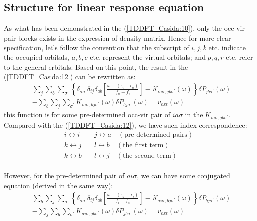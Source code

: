\subsection{Structure for linear response equation}
\label{TDDFT:1}
%
%
%
%
%
As what has been demonstrated in the (\ref{TDDFT_Casida:10}), only
the occ-vir pair blocks exists in the expression of density matrix.
Hence for more clear specification, let's follow the convention
that the subscript of $i,j, k$ etc. indicate the occupied orbitals,
$a, b, c$ etc. represent the virtual orbitals; and $p, q, r$ etc.
refer to the general orbitals.
Based on this point, the result in the (\ref{TDDFT_Casida:12}) can be
rewritten as:
\begin{equation}
\label{TDDFT_Casida:18} 
 \begin{split}
  &\sum_{j}\sum_{b}\sum_{\sigma^{'}}\left\lbrace 
\delta_{\sigma\sigma^{'}}\delta_{ij}\delta_{ab}\left[ 
\frac{\omega - (\epsilon_{i} - \epsilon_{a})}{f_{a} -
f_{i}} \right] 
- K_{ia\sigma,
jb\sigma^{'}}(\omega)
\right\rbrace 
\delta P_{jb\sigma^{'}} (\omega) \\
&- \sum_{b}\sum_{j}\sum_{\sigma^{'}}K_{ia\sigma,
bj\sigma^{'}}(\omega)\delta P_{bj\sigma^{'}} (\omega)
= v_{ext}(\omega)
 \end{split}
\end{equation} 
this function is for some pre-determined occ-vir pair of $ia\sigma$ in
the $K_{ia\sigma, jb\sigma^{'}}$. Compared with the
(\ref{TDDFT_Casida:12}), we have such index correspondence:
\begin{align}
 i \leftrightarrow i  &\quad  j \leftrightarrow a \quad
(\text{pre-determined pairs}) \nonumber \\
 k \leftrightarrow j  &\quad  l \leftrightarrow b \quad
(\text{the first term}) \nonumber \\
 k \leftrightarrow b  &\quad  l \leftrightarrow j \quad
(\text{the second term}) \nonumber \\
\end{align} 

However, for the pre-determined pair of $ai\sigma$, we can have some
conjugated equation (derived in the same way):
\begin{equation}
\label{TDDFT_Casida:19} 
  \begin{split}
  &\sum_{b}\sum_{j}\sum_{\sigma^{'}}\left\lbrace 
\delta_{\sigma\sigma^{'}}\delta_{ij}\delta_{ab}\left[ 
\frac{\omega - (\epsilon_{a} - \epsilon_{i})}{f_{i} -
f_{a}} \right] 
- K_{ai\sigma,
bj\sigma^{'}}(\omega)
\right\rbrace 
\delta P_{bj\sigma^{'}} (\omega) \\
&- \sum_{j}\sum_{b}\sum_{\sigma^{'}}K_{ai\sigma,
jb\sigma^{'}}(\omega)\delta P_{jb\sigma^{'}} (\omega)
= v_{ext}(\omega)
 \end{split}
\end{equation} 

